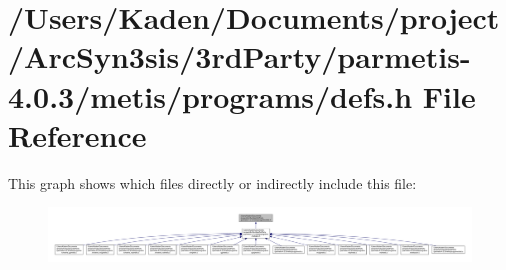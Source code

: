 \hypertarget{a00891}{}\section{/\+Users/\+Kaden/\+Documents/project/\+Arc\+Syn3sis/3rd\+Party/parmetis-\/4.0.3/metis/programs/defs.h File Reference}
\label{a00891}
This graph shows which files directly or indirectly include this file\+:\nopagebreak
\begin{figure}[H]
\begin{center}
\leavevmode
\includegraphics[width=350pt]{a00893}
\end{center}
\end{figure}
